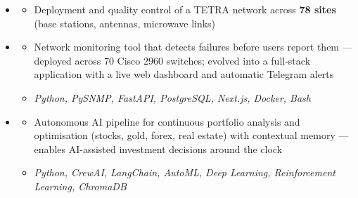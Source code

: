\documentclass[11pt,a4paper]{article}
\renewcommand{\itemspace}{\vspace{0.2em}}
\begin{document}
\begin{itemize}[leftmargin=1em, label={}]
    \itemspace
    \item
    \begin{itemize}[leftmargin=1.5em, label={\textbullet}, nosep]
        \item Deployment and quality control of a TETRA network across \textbf{78 sites} (base stations, antennas, microwave links)
    \end{itemize}
\end{itemize}

\begin{itemize}[leftmargin=1em, label={}]
    \item
    \begin{itemize}[leftmargin=1.5em, label={\textbullet}, nosep]
        \item Network monitoring tool that detects failures before users report them — deployed across 70 Cisco 2960 switches; evolved into a full-stack application with a live web dashboard and automatic Telegram alerts
        \item \emph{Python, PySNMP, FastAPI, PostgreSQL, Next.js, Docker, Bash}
    \end{itemize}

    \itemspace
    \item
    \begin{itemize}[leftmargin=1.5em, label={\textbullet}, nosep]
        \item Autonomous AI pipeline for continuous portfolio analysis and optimisation (stocks, gold, forex, real estate) with contextual memory — enables AI-assisted investment decisions around the clock
        \item \emph{Python, CrewAI, LangChain, AutoML, Deep Learning, Reinforcement Learning, ChromaDB}
    \end{itemize}
\end{itemize}
\end{document}
